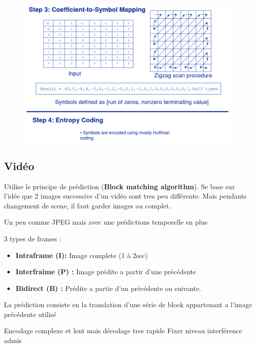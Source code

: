 			\begin{figure}[H]
				\centering
				\includegraphics[width=\textwidth]{img/Compression/DCT3.png}

			\end{figure}
	\subsection{Vidéo}
		Utilise le principe de prédiction (\textbf{Block matching algorithm}). Se base sur l'idée que 2 images successive d'un vidéo sont tres peu différente. Mais pendants changement de scene, il faut garder images au complet.
		
		Un peu comme JPEG mais avec une prédictions temporelle en plus
		
		3 types de frames :
		\begin{itemize}
			\item \textbf{Intraframe (I):} Image complete (1 à 2sec) 
			\item \textbf{Interfraime (P) :} Image prédite a partir d'une précédente
			\item \textbf{Bidirect (B) :} Prédite  a partie d'un précédente ou suivante. 
		\end{itemize}
		
		La prédiction consiste en la translation d'une série de block appartenant a l'image précédente utilisé
		
		Encodage complexe et lent mais décodage tres rapide
			Fixer niveau interférence admis